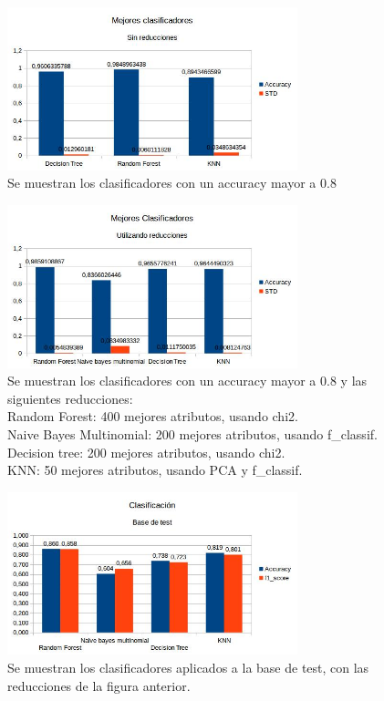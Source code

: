\documentclass[a4paper]{article}
\begin{document}
\begin{figure}[h]
    \centering
    \includegraphics[width=0.75\textwidth]{imagenes/sinredtrain.jpg}
    \caption{Se muestran los clasificadores con un accuracy mayor a 0.8}
    \label{fig:1}
\end{figure}



\begin{figure}[h]
    \centering
    \includegraphics[width=0.75\textwidth]{imagenes/conredtrain.jpg}
    \caption{Se muestran los clasificadores con un accuracy mayor a 0.8 y las siguientes reducciones:\\
   Random Forest: 400 mejores atributos, usando chi2.\\
   Naive Bayes Multinomial: 200 mejores atributos, usando f\_classif.\\
   Decision tree: 200 mejores atributos, usando chi2.\\
   KNN: 50 mejores atributos, usando PCA y f_classif. }
    \label{fig:2}
\end{figure}

\begin{figure}[h]
   \centering
    \includegraphics[width=0.75\textwidth]{imagenes/contratest.jpg}
    \caption{Se muestran los clasificadores aplicados a la base de test, con las reducciones de la figura anterior. } 
  \label{fig:2}
\end{figure}
\end{document}
